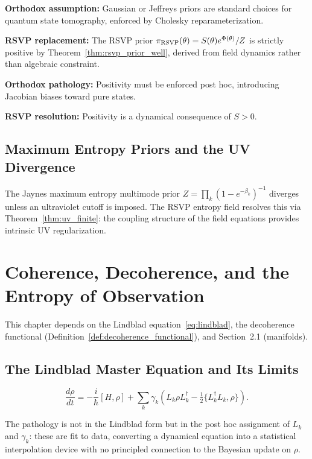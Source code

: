 \documentclass[11pt, openright, twoside]{book}
\theoremstyle{plain}
\theoremstyle{definition}
\theoremstyle{remark}
\newcommand{\Sfield}{S}
\begin{document}
\begin{compbox}
\textbf{Orthodox assumption:} Gaussian or Jeffreys priors are standard choices for quantum
state tomography, enforced by Cholesky reparameterization.

\textbf{RSVP replacement:} The RSVP prior $\pi_{\rm RSVP}(\theta)=\Sfield(\theta)e^{\Phi(\theta)}/Z$
is strictly positive by Theorem~\ref{thm:rsvp_prior_well}, derived from field dynamics
rather than algebraic constraint.

\textbf{Orthodox pathology:} Positivity must be enforced post hoc, introducing Jacobian
biases toward pure states.

\textbf{RSVP resolution:} Positivity is a dynamical consequence of $\Sfield>0$.
\end{compbox}

\section{Maximum Entropy Priors and the UV Divergence}

The Jaynes maximum entropy multimode prior
$Z = \prod_k(1-e^{-\beta_k})^{-1}$ diverges unless an ultraviolet cutoff is imposed.
The RSVP entropy field resolves this via Theorem~\ref{thm:uv_finite}: the coupling
structure of the field equations provides intrinsic UV regularization.

\chapter{Coherence, Decoherence, and the Entropy of Observation}

\begin{depbox}
This chapter depends on the Lindblad equation~\eqref{eq:lindblad}, the decoherence
functional (Definition~\ref{def:decoherence_functional}), and Section~2.1 (manifolds).
\end{depbox}

\section{The Lindblad Master Equation and Its Limits}

\begin{equation}
  \frac{d\rho}{dt} = -\frac{i}{\hbar}[H,\rho]
  + \sum_k\gamma_k\!\left(L_k\rho L_k^\dagger - \tfrac{1}{2}\{L_k^\dagger L_k,\rho\}\right).
  \label{eq:lindblad}
\end{equation}

The pathology is not in the Lindblad form but in the post hoc assignment of $L_k$ and
$\gamma_k$: these are fit to data, converting a dynamical equation into a statistical
interpolation device with no principled connection to the Bayesian update on $\rho$.
\end{document}
